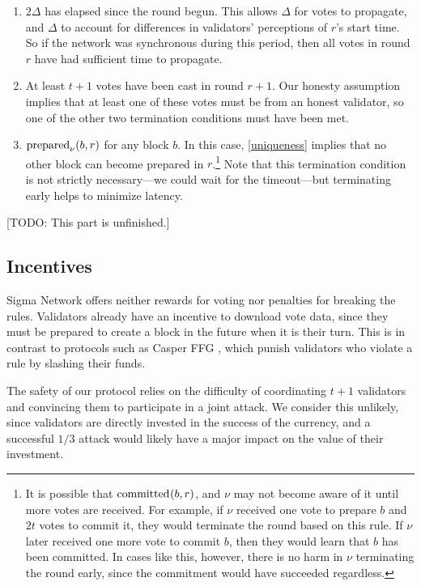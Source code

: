 \begin{enumerate}
  \item $2 \Delta$ has elapsed since the round begun. This allows $\Delta$ for votes to propagate, and $\Delta$ to account for differences in validators' perceptions of $r$'s start time. So if the network was synchronous during this period, then all votes in round $r$ have had sufficient time to propagate.
  \item At least $t + 1$ votes have been cast in round $r + 1$. Our honesty assumption implies that at least one of these votes must be from an honest validator, so one of the other two termination conditions must have been met.
  \item $\prepared[\nu]{b, r}$ for any block $b$. In this case, \autoref{uniqueness} implies that no other block can become prepared in $r$.\footnote{It is possible that $\committed{b, r}$, and $\nu$ may not become aware of it until more votes are received. For example, if $\nu$ received one vote to prepare $b$ and $2t$ votes to commit it, they would terminate the round based on this rule. If $\nu$ later received one more vote to commit $b$, then they would learn that $b$ has been committed. In cases like this, however, there is no harm in $\nu$ terminating the round early, since the commitment would have succeeded regardless.} Note that this termination condition is not strictly necessary---we could wait for the timeout---but terminating early helps to minimize latency.
\end{enumerate}

[TODO: This part is unfinished.]


\subsection{Incentives}

Sigma Network offers neither rewards for voting nor penalties for breaking the rules. Validators already have an incentive to download vote data, since they must be prepared to create a block in the future when it is their turn. This is in contrast to protocols such as Casper FFG \cite{buterin2017casper}, which punish validators who violate a rule by slashing their funds.

The safety of our protocol relies on the difficulty of coordinating $t + 1$ validators and convincing them to participate in a joint attack. We consider this unlikely, since validators are directly invested in the success of the currency, and a successful $1/3$ attack would likely have a major impact on the value of their investment.

